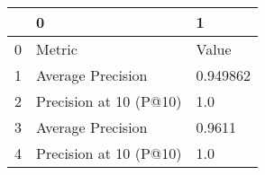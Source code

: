 \begin{tabular}{lll}
\toprule
{} &                       0 &         1 \\
\midrule
0 &                  Metric &     Value \\
1 &       Average Precision &  0.949862 \\
2 &  Precision at 10 (P@10) &       1.0 \\
3 &       Average Precision &    0.9611 \\
4 &  Precision at 10 (P@10) &       1.0 \\
\bottomrule
\end{tabular}
